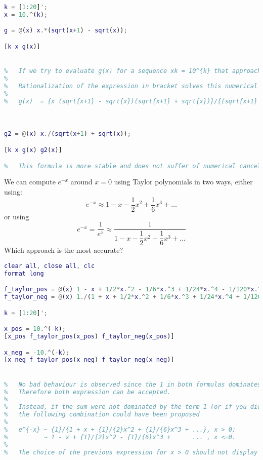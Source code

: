 \documentclass[12pt, a4paper]{report}
\newtheorem[style=M,bodystyle=\normalfont]{theorem}{Theorem}
\newtheorem[style=M,bodystyle=\normalfont]{corollary}{Corollary}
\newtheorem[style=M,bodystyle=\normalfont]{lemma}{Lemma}
\newtheorem[style=M,bodystyle=\normalfont]{definition}{Definition}
\begin{document}
\begin{Answer}[ref=10]
\begin{lstlisting}[language=Matlab]
k = [1:20]';
x = 10.^(k);

g = @(x) x.*(sqrt(x+1) - sqrt(x));

[k x g(x)]


% 	If we try to evaluate g(x) for a sequence xk = 10^{k} that approaches 0, we notice anomalous behaviour at k = 16, k = ..., for which the computed value is 0. This happens since, in floating point representation, x16 + 1 = x16!
% 
% 	Rationalization of the expression in bracket solves this numerical cancellation: indeed, multiplying the numerator and the denominator by sqrt{x+1} + sqrt{x}
% 	
% 	g(x)  = {x (sqrt{x+1} - sqrt{x})(sqrt{x+1} + sqrt{x})}/{(sqrt{x+1} + {x})} = {x}/{(sqrt{x+1} + sqrt{x})}.



g2 = @(x) x./(sqrt(x+1) + sqrt(x));

[k x g(x) g2(x)]

%	This formula is more stable and does not suffer of numerical cancellation.

        \end{lstlisting}
    \end{Answer}

    \newpage

    \begin{Exercise}[label=11]
        We can compute $e^{-x}$ around $x=0$ using Taylor polynomials in two ways, either using:
        \[e^{-x} \approx 1-x-\dfrac{1}{2}x^2+\dfrac{1}{6}x^3+\dots\]
        or using 
        \[e^{-x}=\dfrac{1}{e^x} \approx \dfrac{1}{1-x-\dfrac{1}{2}x^2+\dfrac{1}{6}x^3+\dots}\]
        Which approach is the most accurate?
    \end{Exercise}
    \begin{Answer}[ref=11]
        \begin{lstlisting}[language=Matlab]
clear all, close all, clc
format long

f_taylor_pos = @(x) 1 - x + 1/2*x.^2 - 1/6*x.^3 + 1/24*x.^4 - 1/120*x.^5;
f_taylor_neg = @(x) 1./(1 + x + 1/2*x.^2 + 1/6*x.^3 + 1/24*x.^4 + 1/120*x.^5);

k = [1:20]';

x_pos = 10.^(-k);
[x_pos f_taylor_pos(x_pos) f_taylor_neg(x_pos)]

x_neg = -10.^(-k);
[x_neg f_taylor_pos(x_neg) f_taylor_neg(x_neg)]


% 	No bad behaviour is observed since the 1 in both formulas dominates the sum and numerical cancellation does not occur. 
%   Therefore both expression can be accepted.
% 
% 	Instead, if the sum were not dominated by the term 1 (or if you didn't notice that), 
%   the following combination could have been proposed
% 
% 	e^{-x} ~ {1}/{1 + x + {1}/{2}x^2 + {1}/{6}x^3 + ...}, x > 0;
% 	       ~ 1 - x + {1}/{2}x^2 - {1}/{6}x^3 +      ... , x <=0.
% 	
% 	The choice of the previous expression for x > 0 should not display any numerical cancellation because all the terms in the sum are positive. Similarly, the choice for x < 0 grants that the terms -x^{2k+1} are positive, again avoiding any numerical cancellation.
        \end{lstlisting}
    \end{Answer}
\end{document}

